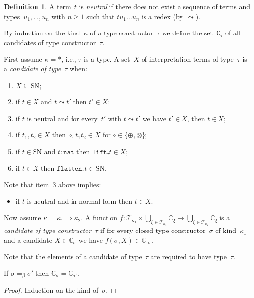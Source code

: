 \documentclass[a4paper,UKenglish,cleveref,autoref,numberwithinsect]{lipics-v2019}
\theoremstyle{definition}
\newtheorem{defn}[theorem]{Definition}
\newcommand{\arrkind}{\Rightarrow}
\newcommand{\arrW}{\leadsto}
\newcommand{\nat}{\mathtt{nat}}
\newcommand{\flatten}{\mathtt{flatten}}
\newcommand{\lift}{\mathtt{lift}}
\newcommand{\Tc}{\mathcal{T}}
\newcommand{\SN}{\mathrm{SN}}
\newcommand{\Cb}{\mathbb{C}}
\begin{document}
\begin{defn}\label{def_candidate}
  A term~$t$ is \emph{neutral} if there does not exist a sequence of
  terms and types~$u_1,\ldots,u_n$ with $n \ge 1$ such that $t u_1
  \ldots u_n$ is a redex (by~$\arrW$).

  By induction on the kind~$\kappa$ of a type constructor~$\tau$ we
  define the set~$\Cb_\tau$ of all candidates of type
  constructor~$\tau$.

  First assume $\kappa=*$, i.e., $\tau$ is a type. A set~$X$ of
  interpretation terms of type~$\tau$ is a \emph{candidate of
    type~$\tau$} when:
  \begin{enumerate}
  \item $X \subseteq \SN$;
  \item if $t \in X$ and $t \arrW t'$ then $t' \in X$;
  \item if $t$ is neutral and for every~$t'$ with $t \arrW t'$ we
    have $t' \in X$, then $t \in X$;
  \item if $t_1,t_2 \in X$ then $\circ_\tau t_1 t_2 \in X$ for
    $\circ \in \{\oplus,\otimes\}$;
  \item if $t \in \SN$ and $t : \nat$ then $\lift_\tau t \in X$;
  \item if $t \in X$ then $\flatten_\tau t \in \SN$.
  \end{enumerate}
  Note that item~3 above implies:
  \begin{itemize}
  \item if $t$ is neutral and in normal form then $t \in X$.
  \end{itemize}

  Now assume $\kappa = \kappa_1\arrkind\kappa_2$. A function $f :
  \Tc_{\kappa_1} \times \bigcup_{\xi\in\Tc_{\kappa_1}}\Cb_\xi \to
  \bigcup_{\xi\in\Tc_{\kappa_2}}\Cb_\xi$ is a \emph{candidate of type
    constructor~$\tau$} if for every closed type constructor~$\sigma$
  of kind~$\kappa_1$ and a candidate $X \in \Cb_\sigma$ we have
  $f(\sigma,X) \in \Cb_{\tau\sigma}$.
\end{defn}

Note that the elements of a candidate of type~$\tau$ are required to
have type~$\tau$.

\begin{lemma}\label{lem_beta_candidate}
  If $\sigma =_\beta \sigma'$ then $\Cb_\sigma = \Cb_{\sigma'}$.
\end{lemma}

\begin{proof}
  Induction on the kind of~$\sigma$.
\end{proof}
\end{document}
